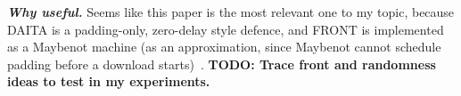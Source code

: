 \textbf{\textit{Why useful.}}
Seems like this paper is the most relevant one to my topic, because DAITA is a padding-only, zero-delay style defence, and FRONT is implemented as a Maybenot machine (as an approximation, since Maybenot cannot schedule padding before a download starts)~\cite{maybenot2023}. \textbf{TODO: Trace front and randomness ideas to test in my experiments.}